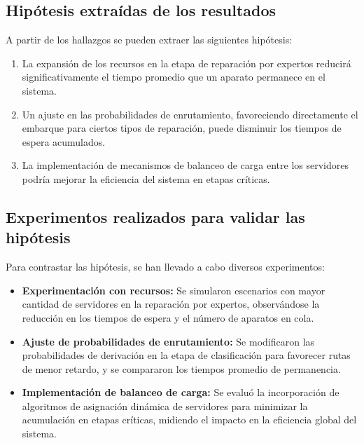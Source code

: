 \documentclass[a4paper,12pt]{article}
\begin{document}
\subsection{Hipótesis extraídas de los resultados}
A partir de los hallazgos se pueden extraer las siguientes hipótesis:
\begin{enumerate}
    \item La expansión de los recursos en la etapa de reparación por expertos reducirá significativamente el tiempo promedio que un aparato permanece en el sistema.
    \item Un ajuste en las probabilidades de enrutamiento, favoreciendo directamente el embarque para ciertos tipos de reparación, puede disminuir los tiempos de espera acumulados.
    \item La implementación de mecanismos de balanceo de carga entre los servidores podría mejorar la eficiencia del sistema en etapas críticas.
\end{enumerate}

\subsection{Experimentos realizados para validar las hipótesis}
Para contrastar las hipótesis, se han llevado a cabo diversos experimentos:
\begin{itemize}
    \item \textbf{Experimentación con recursos:} Se simularon escenarios con mayor cantidad de servidores en la reparación por expertos, observándose la reducción en los tiempos de espera y el número de aparatos en cola.
    \item \textbf{Ajuste de probabilidades de enrutamiento:} Se modificaron las probabilidades de derivación en la etapa de clasificación para favorecer rutas de menor retardo, y se compararon los tiempos promedio de permanencia.
    \item \textbf{Implementación de balanceo de carga:} Se evaluó la incorporación de algoritmos de asignación dinámica de servidores para minimizar la acumulación en etapas críticas, midiendo el impacto en la eficiencia global del sistema.
\end{itemize}
\end{document}

